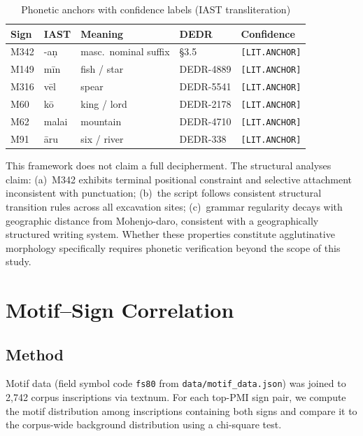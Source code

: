 \documentclass[12pt,letterpaper]{article}
\newcommand{\SAFE}{\textcolor{safegreen}{\texttt{[LIT.ANCHOR]}}}
\begin{document}
\begin{table}[!ht]
\centering
\caption{Phonetic anchors with confidence labels (IAST transliteration)}
\begin{tabularx}{\textwidth}{llXll}
\toprule
Sign & IAST & Meaning & DEDR & Confidence \\
\midrule
M342 & -a\d{n}   & masc.\ nominal suffix & \citet{Krishnamurti2003} \S3.5 & \SAFE \\
M149 & m\={i}n   & fish / star           & DEDR-4889 & \SAFE \\
M316 & v\={e}l   & spear                 & DEDR-5541 & \SAFE \\
M60  & k\={o}    & king / lord           & DEDR-2178 & \SAFE \\
M62  & malai     & mountain              & DEDR-4710 & \SAFE \\
M91  & \={a}ru   & six / river           & DEDR-338  & \SAFE \\
\bottomrule
\end{tabularx}
\end{table}

This framework does not claim a full decipherment.
The structural analyses claim: (a)~M342 exhibits terminal positional
constraint and selective attachment inconsistent with punctuation;
(b)~the script follows consistent structural transition rules across
all excavation sites; (c)~grammar regularity decays with geographic
distance from Mohenjo-daro, consistent with a geographically
structured writing system.
Whether these properties constitute agglutinative morphology
specifically requires phonetic verification beyond the scope of
this study.

\section{Motif--Sign Correlation}
\label{sec:motif}

\subsection{Method}

Motif data (field symbol code \texttt{fs80} from \texttt{data/motif\_data.json})
was joined to 2,742 corpus inscriptions via textnum.
For each top-PMI sign pair, we compute the motif distribution among
inscriptions containing both signs and compare it to the corpus-wide
background distribution using a chi-square test.
\end{document}
